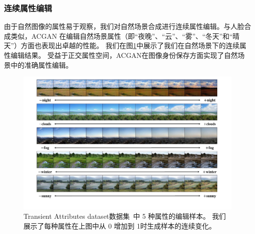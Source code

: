 \subsubsection{连续属性编辑}
由于自然图像的属性易于观察，我们对自然场景合成进行连续属性编辑。与人脸合成类似，ACGAN 在编辑自然场景属性（即“夜晚”、“云”、“雾”、“冬天”和“晴天”）方面也表现出卓越的性能。 我们在图\ref{fig:scene}中展示了我们在自然场景下的连续属性编辑结果。 受益于正交属性空间，ACGAN在图像身份保存方面实现了自然场景中的准确属性编辑。

\begin{figure}
    \begin{center}
         \includegraphics[width=0.85\linewidth]{figures/ACGAN/scene.pdf}
    \end{center}
    \caption{Transient Attributes dataset数据集~\cite{scenedataset}中 5 种属性的编辑样本。 我们展示了每种属性在上图中从 0 增加到 1时生成样本的连续变化。}
    \label{fig:scene}
\end{figure}

